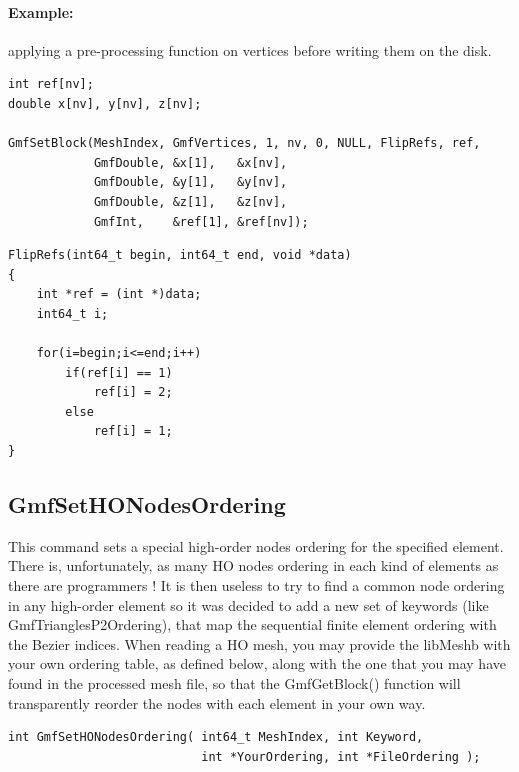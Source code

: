 \documentclass[a4paper,12pt]{article}
\begin{document}
\paragraph{Example:} applying a pre-processing function on vertices before writing them on the disk.

\begin{tt}
\begin{verbatim}
int ref[nv];
double x[nv], y[nv], z[nv];

GmfSetBlock(MeshIndex, GmfVertices, 1, nv, 0, NULL, FlipRefs, ref,
            GmfDouble, &x[1],   &x[nv],
            GmfDouble, &y[1],   &y[nv],
            GmfDouble, &z[1],   &z[nv],
            GmfInt,    &ref[1], &ref[nv]);
\end{verbatim}
\end{tt}
\normalfont

\begin{tt}
\begin{verbatim}
FlipRefs(int64_t begin, int64_t end, void *data)
{
    int *ref = (int *)data;
    int64_t i;

    for(i=begin;i<=end;i++)
        if(ref[i] == 1)
            ref[i] = 2;
        else
            ref[i] = 1;
}
\end{verbatim}
\end{tt}
\normalfont


\subsection{GmfSetHONodesOrdering}
This command sets a special high-order nodes ordering for the specified element.
There is, unfortunately, as many HO nodes ordering in each kind of elements as there are programmers !
It is then useless to try to find a common node ordering in any high-order element so it was decided to add a new set of keywords (like GmfTrianglesP2Ordering), that map the sequential finite element ordering with the Bezier indices.
When reading a HO mesh, you may provide the libMeshb with your own ordering table, as defined below, along with the one that you may have found in the processed mesh file, so that the GmfGetBlock() function will transparently reorder the nodes with each element in your own way.

\begin{tt}
\begin{verbatim}
int GmfSetHONodesOrdering( int64_t MeshIndex, int Keyword,
                           int *YourOrdering, int *FileOrdering );
\end{verbatim}
\end{tt}
\normalfont
\end{document}
